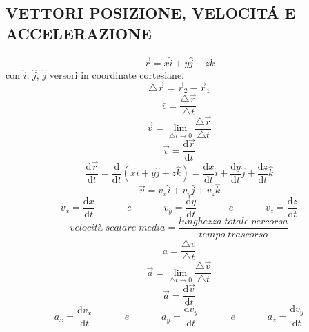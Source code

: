 \documentclass{article}
\newcommand\mathspace{\;\;\;\;\;\;\;\;\;\;\;\; e \;\;\;\;\;\;\;\;\;\;\;\;}
\begin{document}
\begin{multicols}{2}
		\subsection{VETTORI POSIZIONE, VELOCIT\'A E ACCELERAZIONE}
			\begin{equation} \vec r = x \hat{i} + y \hat{j} + z \hat{k} \end{equation}
			con $\hat{i}$, $\hat{j}$, $\hat{j}$ versori in coordinate cortesiane.
			\begin{equation} \triangle \vec{r} = \vec r_2 - \vec r_1 \end{equation}
			\begin{equation} \bar v = \frac{ \triangle \vec r }{ \triangle t } \end{equation}
			\begin{equation} \vec v = \lim_{ \triangle t \to 0} \frac{ \triangle \vec r }{ \triangle t } \end{equation}
			\begin{equation} \vec v = \frac{ \mathrm d \vec r }{ \mathrm d t } \end{equation}
			\begin{equation}
				\frac{ \mathrm d \vec r }{ \mathrm d t } = \frac{ \mathrm d }{ \mathrm d t} ( x \hat i + y \hat j + z \hat k ) =
				\frac{ \mathrm d x }{ \mathrm d t } \hat i + \frac{ \mathrm d y }{ \mathrm d t } \hat j + \frac{ \mathrm d z }{ \mathrm d t } \hat k
			\end{equation}
			\begin{equation} \vec v = v_x \hat i + v_y \hat j + v_z \hat k \end{equation}
			\begin{equation}
				v_x = \frac{ \mathrm d x }{ \mathrm d t } \mathspace
				v_y = \frac{ \mathrm d y }{ \mathrm d t } \mathspace
				v_z = \frac{ \mathrm d z }{ \mathrm d t }
			\end{equation}
			\begin{equation} velocit\textit{à} \; scalare \; media = \frac{ lunghezza \; totale \; percorsa }{ tempo \; trascorso } \end{equation}
			\begin{equation} \bar a = \frac{ \triangle v }{ \triangle t } \end{equation}
			\begin{equation} \vec a = \lim_{ \triangle t \to 0 } \frac{ \triangle \vec v }{ \triangle t } \end{equation}
			\begin{equation} \vec a = \frac{ \mathrm d \vec v }{ \mathrm d t } \end{equation}
			\begin{equation}
				a_x = \frac{ \mathrm d v_x }{ \mathrm d t } \mathspace
				a_y = \frac{ \mathrm d v_y }{ \mathrm d t } \mathspace
				a_z = \frac{ \mathrm d v_y }{ \mathrm d t }
			\end{equation}

\end{multicols}
\end{document}
